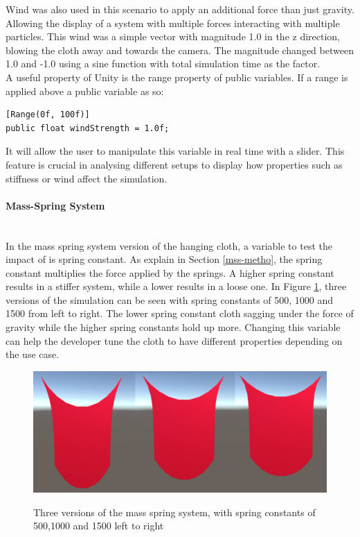 \documentclass[12pt,a4paper]{article}
\begin{document}
Wind was also used in this scenario to apply an additional force than just gravity. Allowing the display of a system with multiple forces interacting with multiple particles. This wind was a simple vector with magnitude 1.0 in the z direction, blowing the cloth away and towards the camera. The magnitude changed between 1.0 and -1.0 using a sine function with total simulation time as the factor. \\

A useful property of Unity is the range property of public variables. If a range is applied above a public variable as so:
\begin{lstlisting}[caption={Unity's range feature},label={lst:rng}]
[Range(0f, 100f)]
public float windStrength = 1.0f;
\end{lstlisting}
It will allow the user to manipulate this variable in real time with a slider. This feature is crucial in analysing different setups to display how properties such as stiffness or wind affect the simulation.

\paragraph{Mass-Spring System} \mbox{} \\
In the mass spring system version of the hanging cloth, a variable to test the impact of is spring constant. As explain in Section \ref{mss-metho}, the spring constant multiplies the force applied by the springs. A higher spring constant results in a stiffer system, while a lower results in a loose one. In Figure \ref{fig:msscomp}, three versions of the simulation can be seen with spring constants of 500, 1000 and 1500 from left to right. The lower spring constant cloth sagging under the force of gravity while the higher spring constants hold up more. Changing this variable can help the developer tune the cloth to have different properties depending on the use case.

\begin{figure}
	\centering
	\caption{Three versions of the mass spring system, with spring constants of 500,1000 and 1500 left to right}
	\includegraphics[scale=0.35]{msscomp.png}
	\label{fig:msscomp}
\end{figure}
\end{document}
